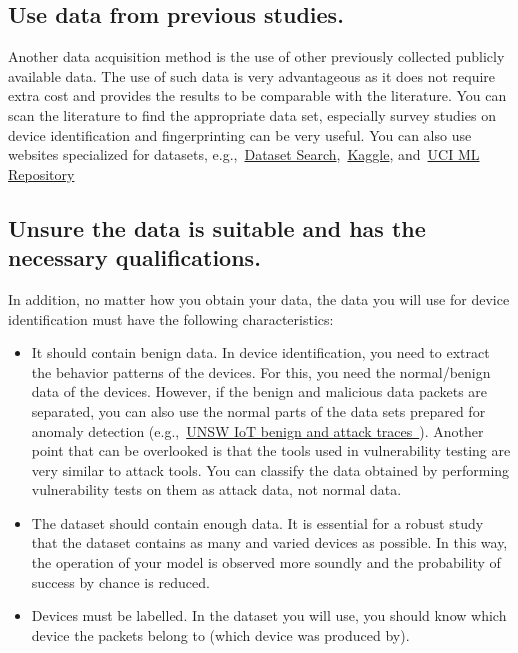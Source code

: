 \documentclass[journal]{IEEEtran}
\begin{document}
\subsection{Use data from previous studies.}
Another data acquisition method is the use of other previously collected publicly available data. The use of such data is very advantageous as it does not require extra cost and provides the results to be comparable with the literature. You can scan the literature to find the appropriate data set, especially survey studies on device identification and fingerprinting can be very useful. You can also use websites specialized for datasets, e.g.,~\href{https://datasetsearch.research.google.com/}{Dataset Search},~\href{https://www.kaggle.com/datasets}{Kaggle}, and~\href{https://archive.ics.uci.edu/ml/datasets.php}{UCI ML Repository}


\subsection{Unsure the data is  suitable and has the  necessary qualifications.}

In addition, no matter how you obtain your data, the data you will use for device identification must have the following characteristics:

\begin{itemize}
	\item It should contain benign data. In device identification, you need to extract the behavior patterns of the devices. For this, you need the normal/benign data of the devices. However, if the benign and malicious  data packets are separated, you can also use the normal parts of the data sets prepared for anomaly detection (e.g.,~\href{https://iotanalytics.unsw.edu.au/attack-data}{UNSW IoT benign and attack traces~\cite{UNSW2018attack}}). Another point that can be overlooked is that the tools used in vulnerability testing are very similar to attack tools. You can classify the data obtained by performing vulnerability tests on them as attack data, not normal data.

	\item The dataset should contain enough data. It is essential for a robust study that the dataset contains as many and varied devices as possible. In this way, the operation of your model is observed more soundly and the probability of success by chance is reduced.
	
	\item Devices must be labelled. In the dataset you will use, you should know which device the packets belong to (which device was produced by).
\end{itemize}
\end{document}
